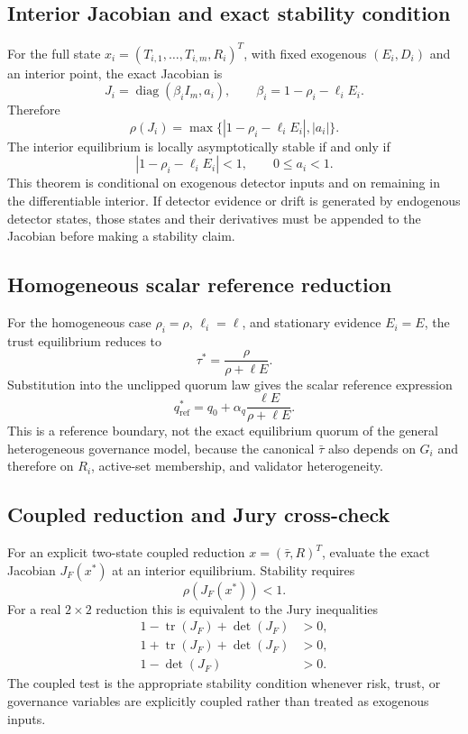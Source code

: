 \documentclass[10pt,journal]{IEEEtran}
\begin{document}
\subsection{Interior Jacobian and exact stability condition}
For the full state $x_i=(T_{i,1},\ldots,T_{i,m},R_i)^T$, with fixed exogenous $(E_i,D_i)$ and an interior point, the exact Jacobian is
\begin{equation}
J_i=\operatorname{diag}(\beta_i I_m,a_i),\qquad
\beta_i=1-\rho_i-\ell_iE_i.
\end{equation}
Therefore
\begin{equation}
\rho(J_i)=\max\{|1-\rho_i-\ell_iE_i|,|a_i|\}.
\end{equation}
The interior equilibrium is locally asymptotically stable if and only if
\begin{equation}
|1-\rho_i-\ell_iE_i|<1,\qquad 0\le a_i<1.
\end{equation}
This theorem is conditional on exogenous detector inputs and on remaining in the differentiable interior. If detector evidence or drift is generated by endogenous detector states, those states and their derivatives must be appended to the Jacobian before making a stability claim.

\subsection{Homogeneous scalar reference reduction}
For the homogeneous case $\rho_i=\rho$, $\ell_i=\ell$, and stationary evidence $E_i=E$, the trust equilibrium reduces to
\begin{equation}
\tau^*=\frac{\rho}{\rho+\ell E}.
\end{equation}
Substitution into the unclipped quorum law gives the scalar reference expression
\begin{equation}
q^*_{\mathrm{ref}}=q_0+\alpha_q\frac{\ell E}{\rho+\ell E}.
\end{equation}
This is a reference boundary, not the exact equilibrium quorum of the general heterogeneous governance model, because the canonical $\bar\tau$ also depends on $G_i$ and therefore on $R_i$, active-set membership, and validator heterogeneity.

\subsection{Coupled reduction and Jury cross-check}
For an explicit two-state coupled reduction $x=(\bar\tau,R)^T$, evaluate the exact Jacobian $J_F(x^*)$ at an interior equilibrium. Stability requires
\begin{equation}
\rho(J_F(x^*))<1.
\end{equation}
For a real $2\times2$ reduction this is equivalent to the Jury inequalities
\begin{align}
1-\operatorname{tr}(J_F)+\det(J_F)&>0,\\
1+\operatorname{tr}(J_F)+\det(J_F)&>0,\\
1-\det(J_F)&>0.
\end{align}
The coupled test is the appropriate stability condition whenever risk, trust, or governance variables are explicitly coupled rather than treated as exogenous inputs.
\end{document}

